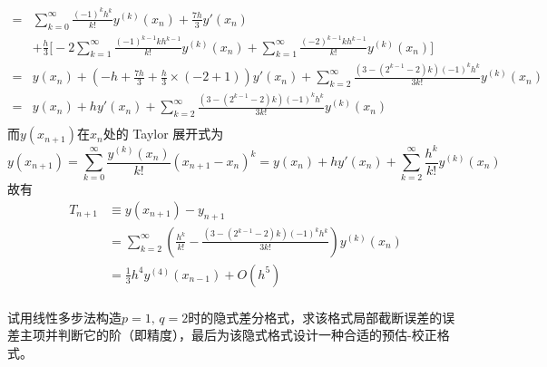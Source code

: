 \documentclass[11pt]{article}
\begin{document}
\begin{question}
{\begin{align*}
        =           & \sum_{k = 0}^{\infty}\frac{(-1)^k h^k}{k!}y^{(k)}(x_{n}) + \frac{7h}{3}y'(x_{ n})                                                                                            \\
                    & + \frac{h}{3}\Bigg[- 2\sum_{k = 1}^{\infty}\frac{(-1)^{k - 1}kh^{k - 1}}{k!}y^{(k)}(x_{n}) + \sum_{k = 1}^{\infty}\frac{(-2)^{k - 1} kh^{k - 1}}{k!}y^{(k)}(x_{n})\Bigg]     \\
        =           & y(x_{n}) + \left(-h + \frac{7h}{3} + \frac{h}{3}\times (-2 + 1)\right)y'(x_{ n}) + \sum_{k = 2}^{\infty}\frac{\left(3 - (2^{k - 1} - 2)k\right)(-1)^kh^k}{3k!}y^{(k)}(x_{n}) \\
        =           & y(x_{n}) + hy'(x_{n}) + \sum_{k = 2}^{\infty}\frac{\left(3 - (2^{k - 1} - 2)k\right)(-1)^kh^k}{3k!}y^{(k)}(x_{n})                                                            \\
    \end{align*}
    而$y(x_{n + 1})$在$x_{n}$处的 Taylor 展开式为
    \begin{equation*}
        y(x_{n + 1}) = \sum_{k = 0}^{\infty}\frac{y^{(k)}(x_{n})}{k!}(x_{n + 1} - x_{n})^k = y(x_{n}) + hy'(x_{n}) + \sum_{k = 2}^{\infty}\frac{h^k}{k!}y^{(k)}(x_{n})
    \end{equation*}
    故有
    \begin{align*}
        T_{n + 1} & \equiv y(x_{n + 1}) - y_{n + 1}                                                                                           \\
                  & = \sum_{k = 2}^{\infty}\left(\frac{h^k}{k!} - \frac{\left(3 - (2^{k - 1} - 2)k\right)(-1)^kh^k}{3k!}\right)y^{(k)}(x_{n}) \\
                  & = \frac{1}{3}h^4y^{(4)}(x_{n - 1}) + O(h^5)                                                                               \\
    \end{align*}
    }
\end{question}

\begin{question}
    \questiontext
    {
        试用线性多步法构造$p = 1,\, q = 2$时的隐式差分格式，求该格式局部截断误差的误差主项并判断它的阶（即精度），最后为该隐式格式设计一种合适的预估-校正格式。
    }
    \answer
    {

    }
\end{question}
\end{document}
